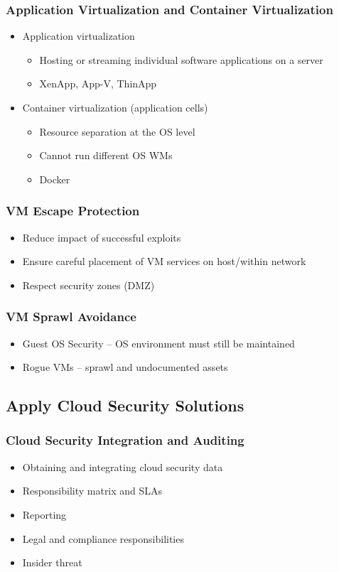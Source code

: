 		\subsubsection {Application Virtualization and Container Virtualization}
			\begin{itemize}
				\item Application virtualization
					\begin{itemize}
						\item Hosting or streaming individual software applications
							on a server
						\item XenApp, App-V, ThinApp
					\end{itemize}
				\item Container virtualization (application cells)
					\begin{itemize}
						\item Resource separation at the OS level
						\item Cannot run different OS WMs
						\item Docker
					\end{itemize}
			\end{itemize}
		\subsubsection {VM Escape Protection}
			\begin{itemize}
				\item Reduce impact of successful exploits
				\item Ensure careful placement of VM services on host/within network
				\item Respect security zones (DMZ)
			\end{itemize}
		\subsubsection {VM Sprawl Avoidance}
			\begin{itemize}
				\item Guest OS Security -- OS environment must still be maintained
				\item Rogue VMs -- sprawl and undocumented assets
			\end{itemize}
	\subsection {Apply Cloud Security Solutions}
		\subsubsection {Cloud Security Integration and Auditing}
			\begin{itemize}
				\item Obtaining and integrating cloud security data
				\item Responsibility matrix and SLAs
				\item Reporting
				\item Legal and compliance responsibilities
				\item Insider threat
			\end{itemize}
